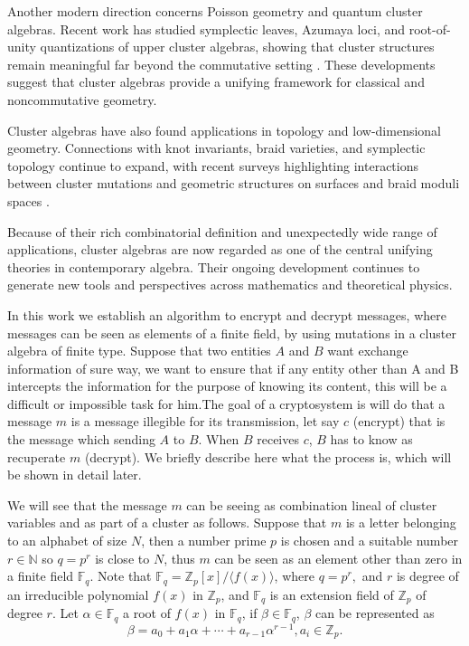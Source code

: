 \documentclass[12pt,a4paper]{article}
\begin{document}
Another modern direction concerns Poisson geometry and quantum cluster algebras. Recent work has studied symplectic leaves, Azumaya loci, and root-of-unity quantizations of upper cluster algebras, showing that cluster structures remain meaningful far beyond the commutative setting \cite{BrownYakimov2024}. These developments suggest that cluster algebras provide a unifying framework for classical and noncommutative geometry.

Cluster algebras have also found applications in topology and low-dimensional geometry. Connections with knot invariants, braid varieties, and symplectic topology continue to expand, with recent surveys highlighting interactions between cluster mutations and geometric structures on surfaces and braid moduli spaces \cite{Oberwolfach2024}.

Because of their rich combinatorial definition and unexpectedly wide range of applications, cluster algebras are now regarded as one of the central unifying theories in contemporary algebra. Their ongoing development continues to generate new tools and perspectives across mathematics and theoretical physics.





\def\row#1/#2!{#1_{\IfStrEq{#2}{}{n}{#2}} & \dynkin{#1}{#2}\\}
\newcommand{\tble}[1]{
  \renewcommand*\do[1]{\row##1!}
  \[
  \begin{array}{ll}\docsvlist{#1}\end{array}
  \]
}

In this work we establish an algorithm to encrypt and decrypt messages, where messages can be seen as elements of a finite field, by using  mutations in a cluster algebra of finite type. Suppose that two entities $A$ and $B$ want exchange information of sure way, we want to ensure that if any entity other than A and B intercepts the information for the purpose of knowing its content, this will be a difficult or impossible task for him.The goal of a cryptosystem is will do that a message $m$ is a message illegible for its transmission, let say  $c$ (encrypt) that is the message which sending $A$ to $B$. When $B$ receives $c$, $B$ has to know as recuperate $m$ (decrypt). We briefly describe here what the process is, which will be shown in detail later.

We will see that the message $m$ can be seeing as combination lineal of cluster variables and as part of a cluster as follows. Suppose that $m$ is a letter belonging to an alphabet of size $N$, 
then a  number prime $p$ is chosen and a suitable number $r\in \mathbb{N}$ so $q=p^r$ is close to $N$,  thus  $m$ can be seen as an element other than zero in a finite field $\mathbb{F}_{q}$.  Note that  $\mathbb{F}_{q}=\mathbb{Z}_p[x]/\langle f(x) \rangle$, where $q=p^r,$  and $r$ is  degree of an irreducible polynomial $f(x)$ in $\mathbb{Z}_p$, and $\mathbb{F}_{q}$ is an extension field of $\mathbb{Z}_p$ of degree $r$. Let $\alpha \in \mathbb{F}_q$ a root of $f(x)$ in $\mathbb{F}_{q}$, if $\beta \in \mathbb{F}_q$, $\beta$  can  be represented as $$\beta = a_0 + a_1 \alpha + \cdots + a_{r-1}\alpha^{r-1}, a_i \in \mathbb{Z}_p.$$
\end{document}
